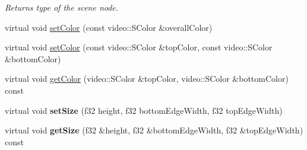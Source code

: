 \begin{DoxyCompactItemize}
\begin{DoxyCompactList}\small\item\em Returns type of the scene node. \end{DoxyCompactList}\item 
virtual void \hyperlink{classirr_1_1scene_1_1_c_billboard_text_scene_node_ae7798492b97f10c62a9232345e9322e1}{set\-Color} (const video\-::\-S\-Color \&overall\-Color)
\item 
virtual void \hyperlink{classirr_1_1scene_1_1_c_billboard_text_scene_node_aab9f9f009df06ad83f5267609fa629b6}{set\-Color} (const video\-::\-S\-Color \&top\-Color, const video\-::\-S\-Color \&bottom\-Color)
\item 
virtual void \hyperlink{classirr_1_1scene_1_1_c_billboard_text_scene_node_a399275c464fa5a7671960da1c839516e}{get\-Color} (video\-::\-S\-Color \&top\-Color, video\-::\-S\-Color \&bottom\-Color) const 
\item 
\hypertarget{classirr_1_1scene_1_1_c_billboard_text_scene_node_a94ad8033e69ce201ad16d3046ae3b022}{virtual void {\bfseries set\-Size} (f32 height, f32 bottom\-Edge\-Width, f32 top\-Edge\-Width)}\label{classirr_1_1scene_1_1_c_billboard_text_scene_node_a94ad8033e69ce201ad16d3046ae3b022}

\item 
\hypertarget{classirr_1_1scene_1_1_c_billboard_text_scene_node_a1fd0f452ee96dec83c04b8308dd35798}{virtual void {\bfseries get\-Size} (f32 \&height, f32 \&bottom\-Edge\-Width, f32 \&top\-Edge\-Width) const }\label{classirr_1_1scene_1_1_c_billboard_text_scene_node_a1fd0f452ee96dec83c04b8308dd35798}

\end{DoxyCompactItemize}


